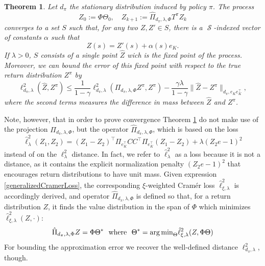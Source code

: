 \documentclass[12pt,a4paper,openright,twoside]{article}
\DeclareMathOperator*{\Sspace}{\mathcal{S}}
\numberwithin{equation}{section}
\newtheorem{theorem}{Theorem}[section]
\theoremstyle{definition}
\theoremstyle{remark}
\theoremstyle{plain}
\begin{document}
\begin{theorem} \label{convergenceLinearCDRL}
	Let $d_\pi$ the stationary distribution induced by policy $\pi$. The process
	\begin{equation*}
		Z_0 := \Phi \Theta_0, \quad Z_{k+1} := \hat{\Pi}_{d_\pi,\lambda,\Phi} T^\pi Z_k
	\end{equation*}
	converges to a set $S$ such that, for any two $Z, Z' \in S$, there is a $\Sspace$-indexed vector of constants $\alpha$ such that
	\begin{equation*}
		Z(s) = Z'(s) + \alpha(s)e_K.
	\end{equation*}
	If $\lambda > 0$, $S$ consists of a single point $\hat{Z}$ wich is the fixed point of the process. Moreover, we can bound the error of this fixed point with respect to the true return distribution $Z^\pi$ by
	\begin{equation*}
		\ell^2_{d_\pi, \lambda} (\hat{Z}, Z^\pi) \leq \frac{1}{1-\gamma} \ell^2_{d_\pi, \lambda} (\Pi_{d_\pi,\lambda,\Phi} Z^\pi, Z^\pi) - \frac{\gamma \lambda}{1-\gamma} \| \hat{Z} - Z^\pi \|_{d_\pi, e_Ke_K^\top},
	\end{equation*}
	where the second terms measures the difference in mass between $\hat{Z}$ and $Z^\pi$.
\end{theorem}


Note, however, that in order to prove convergence Theorem \ref{convergenceLinearCDRL} do not make use of the projection $\Pi_{d_\pi,\lambda,\Phi}$, but the operator $\hat{\Pi}_{d_\pi,\lambda,\Phi}$, which is based on the loss
\begin{equation} \label{generalizedCramerLoss}
	\hat{\ell}_{\lambda}^2(Z_1,Z_2) = (Z_1 - Z_2)^\top \Pi_{e_K^\top} C C^\top \Pi_{e_K^\top} (Z_1 - Z_2) + \lambda (Z_2 e -1)^2 
\end{equation}
instead of on the $\ell^2_\lambda$ distance. In fact, we refer to $\hat{\ell}_{\lambda}^2$ as a loss because it is not a distance, as it contains the explicit normalization penalty $(Z_2 e -1)^2$ that encourages return distributions to have unit mass. Given expression \ref{generalizedCramerLoss}, the corresponding $\xi$-weighted Cramér loss $\hat{\ell}_{\xi, \lambda}^2$ is accordingly derived, and operator $\hat{\Pi}_{d_\pi,\lambda,\Phi}$ is defined so that, for a return distribution $Z$, it finds the value distribution in the span of $\Phi$ which minimizes $\hat{\ell}_{\xi, \lambda}^2(Z, \cdot)$:
\begin{equation} \label{operatorCramérLoss}
	\hat{\Pi}_{d_\pi,\lambda,\Phi} Z = \Phi \Theta^* \ \textnormal{ where } \ \Theta^* = {\arg \min}_{\Theta} \hat{\ell}_{\xi, \lambda}^2(Z, \Phi \Theta)
\end{equation}
For bounding the approximation error we recover the well-defined distance $\ell^2_{d_\pi, \lambda}$, though.
\end{document}
